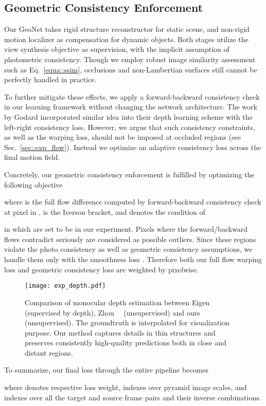 \fi



\subsection{Geometric Consistency Enforcement}
\label{sec::geocst}
Our GeoNet takes rigid structure reconstructor for static scene, and non-rigid motion localizer as compensation for dynamic objects. Both stages utilize the view synthesis objective as supervision, with the implicit assumption of photometric consistency. Though we employ robust image similarity assessment such as Eq.~\eqref{equa::ssim}, occlusions and non-Lambertian surfaces still cannot be perfectly handled in practice.

To further mitigate these effects, we apply a forward-backward consistency check in our learning framework without changing the network architecture. The work by Godard \etal \cite{monodepth17} incorporated similar idea into their depth learning scheme with the left-right consistency loss. However, we argue that such consistency constraints, as well as the warping loss, should not be imposed at occluded regions (see Sec.~\ref{sec::exp_flow}). Instead we optimize an adaptive consistency loss across the final motion field.
 
Concretely, our geometric consistency enforcement is fulfilled by optimizing the following objective

where  is the full flow difference computed by forward-backward consistency check at pixel  in ,  is the Iverson bracket, and  denotes the condition of  

in which  are set to be  in our experiment. 
Pixels where the forward/backward flows contradict seriously are considered as possible outliers. Since these regions violate the photo consistency as well as geometric consistency assumptions, we handle them only with the smoothness loss . 
Therefore both our full flow warping loss  and geometric consistency loss  are weighted by  pixelwise.

\iffalse



\fi

\begin{figure*}[t]
\begin{center}
   \texttt{[image: exp\_depth.pdf]}
\end{center}
\vspace{-1ex}
   \caption{Comparison of monocular depth estimation between Eigen~\etal~\cite{EigenPF14} (supervised by depth), Zhou~\etal~\cite{zhou2017unsupervised} (unsupervised) and ours (unsupervised). The groundtruth is interpolated for visualization purpose. Our method captures details in thin structures and preserves consistently high-quality predictions both in close and distant regions.}
   \vspace{-2ex}
\label{fig::exp_depth}
\end{figure*}



To summarize, our final loss through the entire pipeline becomes

where  denotes respective loss weight,  indexes over pyramid image scales, and  indexes over all the target and source frame pairs and their inverse combinations. 


